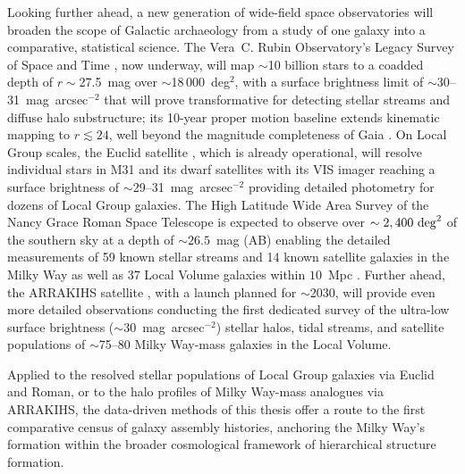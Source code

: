 Looking further ahead, a new generation of wide-field space observatories will broaden the scope of 
Galactic archaeology from a study of one galaxy into a comparative, statistical science.
The Vera~C. Rubin Observatory's Legacy Survey of Space and Time \citep[LSST;][]{Ivezic2008}, 
now underway, will map $\sim$10 billion stars to a coadded depth of $r\sim$27.5~mag over $\sim$18\,000~deg$^{2}$, 
with a surface brightness limit of $\sim$30--31~mag~arcsec$^{-2}$ that will prove transformative 
for detecting stellar streams and diffuse halo substructure; 
its 10-year proper motion baseline extends kinematic mapping to $r\lesssim24$, 
well beyond the magnitude completeness of Gaia \citep{Bonaca2025}.
On Local Group scales, the Euclid satellite \citep{Euclid2025}, which is already operational, will 
resolve individual stars in M31 and its dwarf satellites with its VIS imager reaching 
a surface brightness of $\sim$29--31~mag~arcsec$^{-2}$ providing detailed photometry  
for dozens of Local Group galaxies.
The High Latitude Wide Area 
Survey of the Nancy Grace Roman Space Telescope is expected to observe
over $\sim2,400~\rm{deg}^2$ of the southern sky at a depth of $\sim26.5$~mag (AB) 
enabling the detailed measurements of 59 known stellar streams and 14 known satellite
galaxies in the Milky Way as well as 37 Local Volume galaxies within $10$~Mpc \citep{Sanderson2026}. 
Further ahead, the ARRAKIHS satellite \citep{Guzman2022}, with a launch planned for $\sim$2030,
will provide even more detailed observations conducting the first dedicated survey of the ultra-low surface brightness ($\sim$30~mag~arcsec$^{-2}$) 
stellar halos, tidal streams, and satellite populations 
of $\sim$75--80 Milky Way-mass galaxies in the Local Volume.

Applied to the resolved stellar populations of Local Group galaxies via Euclid 
and Roman, or to the halo profiles of Milky Way-mass analogues via ARRAKIHS, 
the data-driven methods of this thesis offer a route to the first comparative 
census of galaxy assembly histories, anchoring the Milky Way's formation within 
the broader cosmological framework of hierarchical structure formation.
